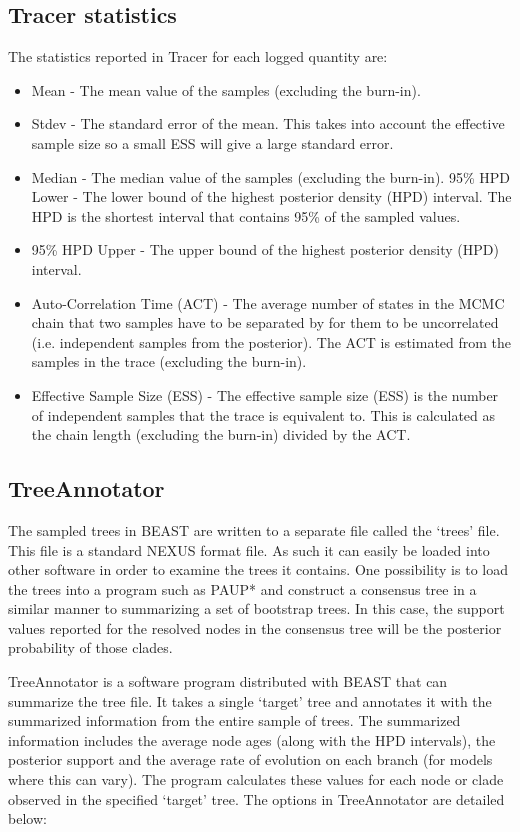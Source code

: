 \documentclass[11pt]{article}
\begin{document}
\subsection*{Tracer statistics}

The statistics reported in Tracer for each logged quantity are:

\begin{itemize}
\item Mean - The mean value of the samples (excluding the burn-in).
\item Stdev - The standard error of the mean. This takes into account the effective sample size so a small ESS will give a large
standard error.
\item Median - The median value of the samples (excluding the burn-in).
95\% HPD Lower - The lower bound of the highest posterior density (HPD) interval. The HPD is the shortest interval that
contains 95\% of the sampled values.
\item 95\% HPD Upper - The upper bound of the highest posterior density (HPD) interval.
\item Auto-Correlation Time (ACT) - The average number of states in the MCMC chain that two samples have to be separated
by for them to be uncorrelated (i.e. independent samples from the posterior). The ACT is estimated from the samples in the
trace (excluding the burn-in).
\item Effective Sample Size (ESS) - The effective sample size (ESS) is the number of independent samples that the trace is
equivalent to. This is calculated as the chain length (excluding the burn-in) divided by the ACT.
\end{itemize}

\subsection*{TreeAnnotator}

The sampled trees in BEAST are written to a separate file called the `trees' file. This file is a
standard NEXUS format file. As such it can easily be loaded into other software in order to examine the trees it contains. One
possibility is to load the trees into a program such as PAUP* and construct a consensus tree in a similar manner to
summarizing a set of bootstrap trees. In this case, the support values reported for the resolved nodes in the consensus tree
will be the posterior probability of those clades.

TreeAnnotator is a software program distributed with BEAST that can summarize the tree file. 
It takes a single `target' tree and annotates it with the summarized information from the entire sample of trees.
The summarized information includes the average node ages (along with the HPD intervals), the posterior support and the
average rate of evolution on each branch (for models where this can vary). The program calculates these values for each
node or clade observed in the specified `target' tree. The options in TreeAnnotator are detailed below:
\end{document}
